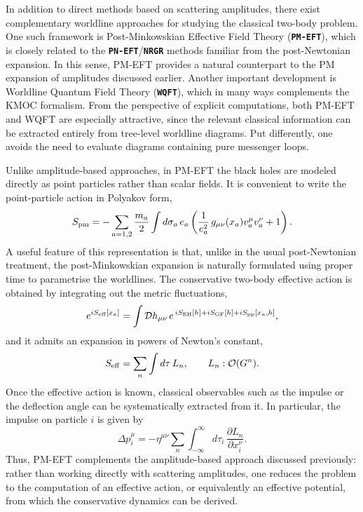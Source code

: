  In addition to direct methods based on scattering amplitudes, there exist complementary worldline approaches for studying the classical two-body problem. One such framework is Post-Minkowskian Effective Field Theory (\textbf{\texttt{PM-EFT}}), which is closely related to the \textbf{\texttt{PN-EFT}}/\textbf{\texttt{NRGR}} methods familiar from the post-Newtonian expansion. In this sense, PM-EFT provides a natural counterpart to the PM expansion of amplitudes discussed earlier. Another important development is Worldline Quantum Field Theory (\textbf{\texttt{WQFT}}), which in many ways complements the KMOC formalism. From the perspective of explicit computations, both PM-EFT and WQFT are especially attractive, since the relevant classical information can be extracted entirely from tree-level worldline diagrams. Put differently, one avoids the need to evaluate diagrams containing pure messenger loops.

Unlike amplitude-based approaches, in PM-EFT the black holes are modeled directly as point particles rather than scalar fields. It is convenient to write the point-particle action in Polyakov form,
\begin{equation}
       S_{\rm pm}
       =
       -\sum_{a=1,2}\frac{m_a}{2}\int d\sigma_a\, e_a
       \left(
       \frac{1}{e_a^2}\,g_{\mu\nu}(x_a)v_a^\mu v_a^\nu+1
       \right).
  \end{equation}
A useful feature of this representation is that, unlike in the usual post-Newtonian treatment, the post-Minkowskian expansion is naturally formulated using proper time to parametrise the worldlines. The conservative two-body effective action is obtained by integrating out the metric fluctuations,
\begin{equation}
    e^{iS_{\rm eff}[x_a]}
    =
    \int \mathcal{D}h_{\mu\nu}\,
    e^{\,iS_{\rm EH}[h]+iS_{\rm GF}[h]+iS_{\rm pp}[x_a,h]},
\end{equation}
and it admits an expansion in powers of Newton's constant,
\begin{equation}
    S_{\rm eff}=\sum_n \int d\tau\, L_n,
    \qquad
    L_n:\mathcal O(G^n).
\end{equation}
Once the effective action is known, classical observables such as the impulse or the deflection angle can be systematically extracted from it. In particular, the impulse on particle \(i\) is given by
\begin{equation}
    \Delta p_i^\mu
    =
    -\eta^{\mu\nu}\sum_n \int_{-\infty}^{\infty} d\tau_i\,
    \frac{\partial L_n}{\partial x_i^\nu}.
\end{equation}
Thus, PM-EFT complements the amplitude-based approach discussed previously: rather than working directly with scattering amplitudes, one reduces the problem to the computation of an effective action, or equivalently an effective potential, from which the conservative dynamics can be derived.

